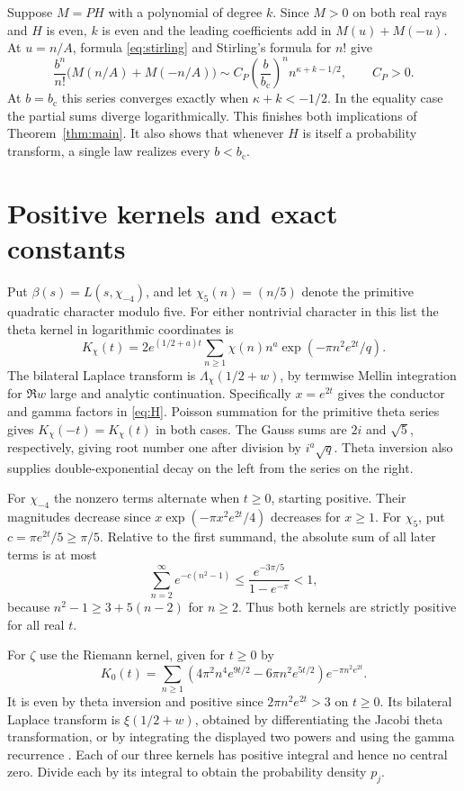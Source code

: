 \documentclass[11pt,letterpaper]{article}
\newcommand{\bcrit}{b_{\mathrm c}}
\begin{document}
Suppose $M=PH$ with a polynomial of degree $k$. Since $M>0$ on both real rays and $H$ is even, $k$ is even and the leading coefficients add in $M(u)+M(-u)$. At $u=n/A$, formula \eqref{eq:stirling} and Stirling's formula for $n!$ give
\begin{equation}
 \frac{b^n}{n!}\big(M(n/A)+M(-n/A)\big)
   \sim C_P\left(\frac{b}{\bcrit}\right)^n n^{\kappa+k-1/2},
   \qquad C_P>0 .
 \label{eq:p-series}
\end{equation}
At $b=\bcrit$ this series converges exactly when $\kappa+k<-1/2$. In the equality case the partial sums diverge logarithmically. This finishes both implications of Theorem~\ref{thm:main}. It also shows that whenever $H$ is itself a probability transform, a single law realizes every $b<\bcrit$.



\section{Positive kernels and exact constants}\label{sec:examples}
Put $\beta(s)=L(s,\chi_{-4})$, and let $\chi_5(n)=(n/5)$ denote the primitive quadratic character modulo five. For either nontrivial character in this list the theta kernel in logarithmic coordinates is
\begin{equation}
 K_\chi(t)=2e^{(1/2+a)t}\sum_{n\ge1}\chi(n)n^a\exp(-\pi n^2e^{2t}/q).
 \label{eq:theta}
\end{equation}
The bilateral Laplace transform is $\Lambda_\chi(1/2+w)$, by termwise Mellin integration for $\Re w$ large and analytic continuation. Specifically $x=e^{2t}$ gives the conductor and gamma factors in \eqref{eq:H}. Poisson summation for the primitive theta series gives $K_\chi(-t)=K_\chi(t)$ in both cases. The Gauss sums are $2i$ and $\sqrt5$, respectively, giving root number one after division by $i^a\sqrt q$. Theta inversion also supplies double-exponential decay on the left from the series on the right.

For $\chi_{-4}$ the nonzero terms alternate when $t\ge0$, starting positive. Their magnitudes decrease since $x\exp(-\pi x^2 e^{2t}/4)$ decreases for $x\ge1$. For $\chi_5$, put $c=\pi e^{2t}/5\ge\pi/5$. Relative to the first summand, the absolute sum of all later terms is at most
\[
 \sum_{n=2}^{\infty}e^{-c(n^2-1)}\le\frac{e^{-3\pi/5}}{1-e^{-\pi}}<1,
\]
because $n^2-1\ge3+5(n-2)$ for $n\ge2$. Thus both kernels are strictly positive for all real $t$.

For $\zeta$ use the Riemann kernel, given for $t\ge0$ by
\begin{equation}
 K_0(t)=\sum_{n\ge1}\left(4\pi^2 n^4 e^{9t/2}-6\pi n^2 e^{5t/2}\right)
                                e^{-\pi n^2 e^{2t}} .
 \label{eq:riemann}
\end{equation}
It is even by theta inversion and positive since $2\pi n^2e^{2t}>3$ on $t\ge0$. Its bilateral Laplace transform is $\xi(1/2+w)$, obtained by differentiating the Jacobi theta transformation, or by integrating the displayed two powers and using the gamma recurrence \cite{riemann,proveit}. Each of our three kernels has positive integral and hence no central zero. Divide each by its integral to obtain the probability density $p_j$.
\end{document}
